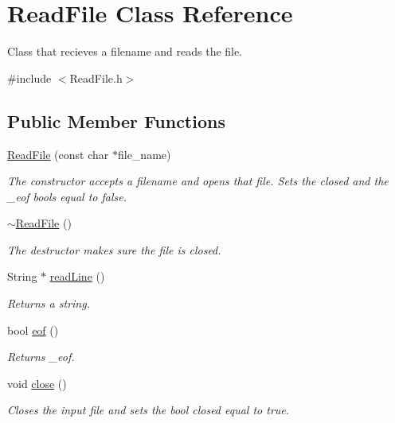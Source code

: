 \hypertarget{class_read_file}{}\section{Read\+File Class Reference}
\label{class_read_file}


Class that recieves a filename and reads the file.  




{\ttfamily \#include $<$Read\+File.\+h$>$}

\subsection*{Public Member Functions}
\begin{DoxyCompactItemize}
\item 
\mbox{\label{class_read_file_ac7f5f0f0326869fcf504f84047c530a2}} 
\hyperlink{class_read_file_ac7f5f0f0326869fcf504f84047c530a2}{Read\+File} (const char $\ast$file\+\_\+name)
\begin{DoxyCompactList}\small\item\em The constructor accepts a filename and opens that file. Sets the closed and the \+\_\+eof bools equal to false. \end{DoxyCompactList}\item 
\mbox{\label{class_read_file_a6907d1c4540eda101bfef2ba2b87af4b}} 
\hyperlink{class_read_file_a6907d1c4540eda101bfef2ba2b87af4b}{$\sim$\+Read\+File} ()
\begin{DoxyCompactList}\small\item\em The destructor makes sure the file is closed. \end{DoxyCompactList}\item 
\mbox{\label{class_read_file_a49e3c08677b370a59ad8a1925ce01829}} 
String $\ast$ \hyperlink{class_read_file_a49e3c08677b370a59ad8a1925ce01829}{read\+Line} ()
\begin{DoxyCompactList}\small\item\em Returns a string. \end{DoxyCompactList}\item 
\mbox{\label{class_read_file_a04a448646a2125106a323f64fa4e8410}} 
bool \hyperlink{class_read_file_a04a448646a2125106a323f64fa4e8410}{eof} ()
\begin{DoxyCompactList}\small\item\em Returns \+\_\+eof. \end{DoxyCompactList}\item 
\mbox{\label{class_read_file_a8450f314db3d210600b17987da635188}} 
void \hyperlink{class_read_file_a8450f314db3d210600b17987da635188}{close} ()
\begin{DoxyCompactList}\small\item\em Closes the input file and sets the bool closed equal to true. \end{DoxyCompactList}\end{DoxyCompactItemize}


